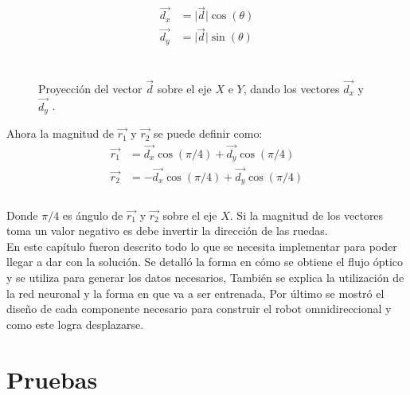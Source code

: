 \documentclass{iccmemoria}
\begin{document}
\begin{equation}
	\begin{split}
	\vec{d_{x}} & = \lvert \vec{d} \rvert \cos(\theta)\\
	\vec{d_{y}} & = \lvert \vec{d} \rvert \sin(\theta)\\
	\end{split}
\end{equation}\\

\begin{figure}[H]
  \centering
  \begin{large}
  
  \end{large}
  \caption[Proyección del vector $\vec{d}$ sobre el eje $X$ e $Y$.]{Proyección del vector $\vec{d}$ sobre el eje $X$ e $Y$, dando los vectores $\vec{d_{x}}$ y $\vec{d_{y}}$ .}
  \label{fig:vec_proyection}
\end{figure}

Ahora la magnitud de $\vec{r_{1}}$ y $\vec{r_{2}}$ se puede definir como:\\

\begin{equation}
	\begin{split}
	\vec{r_{1}} & = \vec{d_{x}}\cos(\pi/4)  + \vec{d_{y}}\cos(\pi/4)\\
	\vec{r_{2}} & = -\vec{d_{x}}\cos(\pi/4) + \vec{d_{y}}\cos(\pi/4)\\
	\end{split}
\end{equation}\\

Donde $\pi/4$ es ángulo de $\vec{r_{1}}$ y $\vec{r_{2}}$ sobre el eje $X$. Si la magnitud de los vectores toma un valor negativo es debe invertir la dirección de las ruedas.\\

En este capítulo fueron descrito todo lo que se necesita implementar para poder llegar a dar con la solución. Se detalló la forma en cómo se obtiene el flujo óptico y se utiliza para generar los datos necesarios, También se explica la utilización de la red neuronal y la forma en que va a ser entrenada, Por último se mostró el diseño de cada componente necesario para construir el robot omnidireccional y como este logra desplazarse.\\

\chapter{Pruebas}
\end{document}
